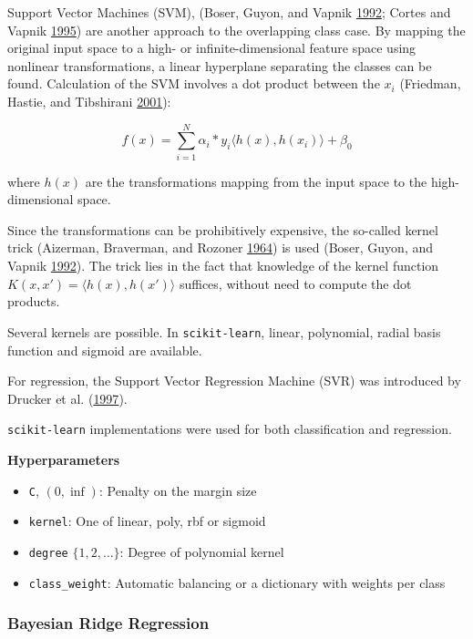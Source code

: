 \documentclass[
  11pt,
  a4paper,
  DIV=12,captions=tableheading,oneside,titlepage]{scrbook}
\providecommand{\tightlist}{%
  \setlength{\itemsep}{0pt}\setlength{\parskip}{0pt}}
\begin{document}
Support Vector Machines (SVM), (Boser, Guyon, and Vapnik \protect\hyperlink{ref-boser1992svc}{1992}; Cortes and Vapnik \protect\hyperlink{ref-cortes1995support}{1995}) are another approach to the overlapping class case. By mapping the original input space to a high- or infinite-dimensional feature space using nonlinear transformations, a linear hyperplane separating the classes can be found. Calculation of the SVM involves a dot product between the \(x_i\) (Friedman, Hastie, and Tibshirani \protect\hyperlink{ref-friedman2001elements}{2001}):

\begin{equation}
f(x) = \sum_{i=1}^N \alpha_i*y_i\langle h(x), h(x_i)\rangle + \beta_0
\label{eq:svm}
\end{equation}

where \(h(x)\) are the transformations mapping from the input space to the high-dimensional space.

Since the transformations can be prohibitively expensive, the so-called kernel trick (Aizerman, Braverman, and Rozoner \protect\hyperlink{ref-aizerman1964theoretical}{1964}) is used (Boser, Guyon, and Vapnik \protect\hyperlink{ref-boser1992svc}{1992}). The trick lies in the fact that knowledge of the kernel function \(K(x,x') = \langle h(x), h(x') \rangle\) suffices, without need to compute the dot products.

Several kernels are possible. In \texttt{scikit-learn}, linear, polynomial, radial basis function and sigmoid are available.

For regression, the Support Vector Regression Machine (SVR) was introduced by Drucker et al. (\protect\hyperlink{ref-drucker1997support}{1997}).

\texttt{scikit-learn} implementations were used for both classification and regression.

\textbf{Hyperparameters}

\begin{itemize}
\tightlist
\item
  \texttt{C}, \((0,\inf)\): Penalty on the margin size
\item
  \texttt{kernel}: One of linear, poly, rbf or sigmoid
\item
  \texttt{degree} \(\{1,2, \ldots \}\): Degree of polynomial kernel
\item
  \texttt{class\_weight}: Automatic balancing or a dictionary with weights per class
\end{itemize}

\hypertarget{bayesian-ridge-regression}{%
\subsubsection{Bayesian Ridge Regression}\label{bayesian-ridge-regression}}
\end{document}
